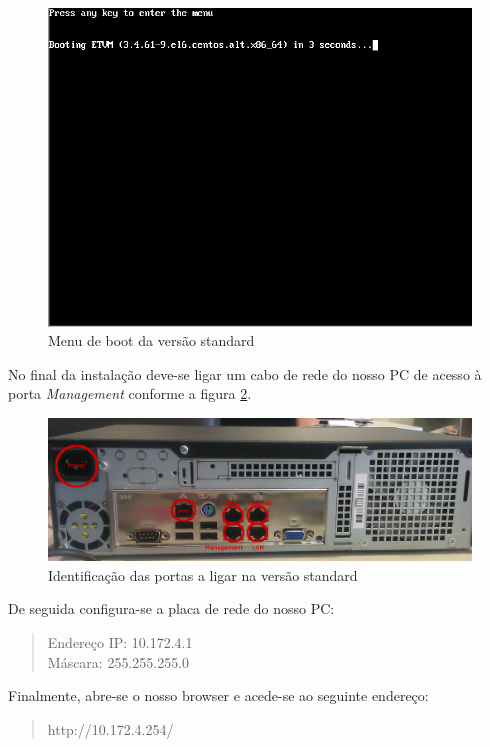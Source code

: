 \begin{figure}[H]
	\begin{center}
	\includegraphics[scale=0.4]{screenshots/install/unitbox/pos_install_bootmenu.png}
	\caption{Menu de boot da versão standard}
	\label{fig:boot_screen_standard}
	\end{center}
\end{figure}

No final da instalação deve-se ligar um cabo de rede do nosso PC de acesso à porta \emph{Management} conforme a figura \ref{fig:back_standard}.

\begin{figure}[H]
	\begin{center}
	\includegraphics[scale=0.30]{screenshots/appliance_back_g3.jpg}
	\caption{Identificação das portas a ligar na versão standard}
	\label{fig:back_standard}
	\end{center}
\end{figure}

De seguida configura-se a placa de rede do nosso PC:

\begin{quote}
Endereço IP: 10.172.4.1\\
Máscara: 255.255.255.0
\end{quote}

Finalmente, abre-se o nosso browser e acede-se ao seguinte endereço:
\begin{quote}
http://10.172.4.254/
\end{quote}

\pagebreak
